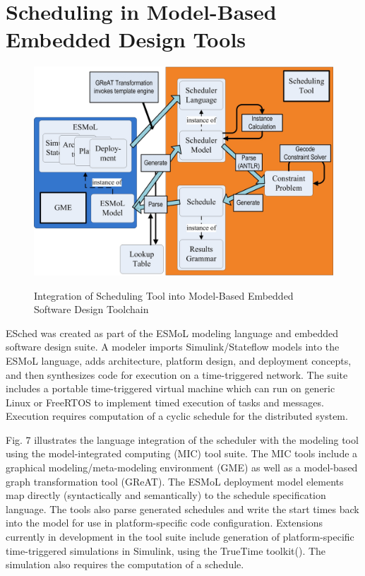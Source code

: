 \section{Scheduling in Model-Based Embedded Design Tools}
\label{integration}

\begin{figure}
		\includegraphics[scale=.9]{figures/adapter.jpg}
		\centering
	  \label{fig:adapter}
		\caption{Integration of Scheduling Tool into Model-Based Embedded Software Design Toolchain}
\end{figure}

ESched was created as part of the ESMoL modeling language and embedded software design suite\cite{modeling:aces08}.  A modeler imports Simulink/Stateflow models\cite{tools:mathworks} into the ESMoL language, adds architecture, platform design, and deployment concepts, and then synthesizes code for execution on a time-triggered network.  The suite includes a portable time-triggered virtual machine\cite{timed:frodo} which can run on generic Linux or FreeRTOS to implement timed execution of tasks and messages.  Execution requires computation of a cyclic schedule for the distributed system.

Fig. 7 illustrates the language integration of the scheduler with the modeling tool using the model-integrated computing (MIC) tool suite\cite{mic:overview}.  The MIC tools include a graphical modeling/meta-modeling environment (GME\cite{mic:gme}) as well as a model-based graph transformation tool (GReAT\cite{mic:GReAT}).  The ESMoL deployment model elements map directly (syntactically and semantically) to the schedule specification language.  The tools also parse generated schedules and write the start times back into the model for use in platform-specific code configuration.  Extensions currently in development in the tool suite include generation of platform-specific time-triggered simulations in Simulink, using the TrueTime toolkit(\cite{tools:truetime}).  The simulation also requires the computation of a schedule.


